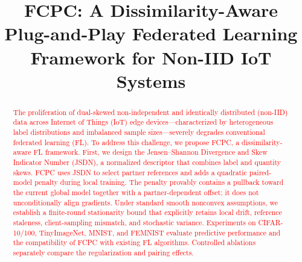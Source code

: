 \documentclass[journal,twoside,web]{ieeecolor}
\newcommand{\rev}[1]{\textcolor{red}{#1}}
\begin{document}
\title{FCPC: A Dissimilarity-Aware Plug-and-Play Federated Learning Framework for Non-IID IoT Systems}



\maketitle


\begin{abstract}
\rev{The proliferation of dual-skewed non-independent and identically distributed (non-IID) data across Internet of Things (IoT) edge devices---characterized by heterogeneous label distributions and imbalanced sample sizes---severely degrades conventional federated learning (FL). To address this challenge, we propose FCPC, a dissimilarity-aware FL framework. First, we design the Jensen--Shannon Divergence and Skew Indicator Number (JSDN), a normalized descriptor that combines label and quantity skews. FCPC uses JSDN to select partner references and adds a quadratic paired-model penalty during local training. The penalty provably contains a pullback toward the current global model together with a partner-dependent offset; it does not unconditionally align gradients. Under standard smooth nonconvex assumptions, we establish a finite-round stationarity bound that explicitly retains local drift, reference staleness, client-sampling mismatch, and stochastic variance. Experiments on CIFAR-10/100, TinyImageNet, MNIST, and FEMNIST evaluate predictive performance and the compatibility of FCPC with existing FL algorithms. Controlled ablations separately compare the regularization and pairing effects.}

\end{abstract}
\end{document}
